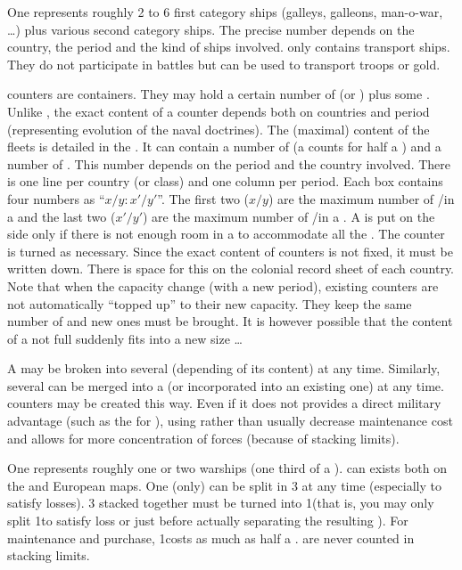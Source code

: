 \aparag[Detachments.] One \ND represents roughly 2 to 6 first category ships
(galleys, galleons, man-o-war, \ldots) plus various second category ships. The
precise number depends on the country, the period and the kind of ships
involved.
\bparag \NTD only contains transport ships. They do not participate in battles
but can be used to transport troops or gold.

\aparag[Fleets.] \FLEET counters are containers. They may hold a certain
number of \NWD (or \NGD) plus some \NTD.
\bparag Unlike \ARMY, the exact content of a \FLEET counter depends both on
countries and period (representing evolution of the naval doctrines).
\bparag The (maximal) content of the fleets is detailed in the
. It can contain a number of \NWD (a
\NGD counts for half a \NWD) and a number of \NTD. This number depends on the
period and the country involved.
\bparag There is one line per country (or class) and one column per
period. Each box contains four numbers as ``$x/y:x'/y'$''. The first two
($x/y$) are the maximum number of \NWD/\NTD in a \FLEET\facemoins and the last
two ($x'/y'$) are the maximum number of \NWD/\NTD in a \FLEET\faceplus.
\bparag A \FLEET is put on the side \Faceplus only if there is not enough room
in a \FLEET\facemoins to accommodate all the \ND. The counter is turned as
necessary.
\bparag Since the exact content of \FLEET counters is not fixed, it must be
written down. There is space for this on the colonial record sheet of each
country.
\bparag Note that when the capacity change (with a new period), existing
\FLEET counters are not automatically ``topped up'' to their new
capacity. They keep the same number of \ND and new ones must be brought. It is
however possible that the content of a not full \FLEET\Faceplus suddenly fits
into a new size \FLEET\Facemoins\ldots


 A \FLEET may be broken into several \ND
(depending of its content) at any time.
\bparag Similarly, several \ND can be merged into a \FLEET (or incorporated
into an existing one) at any time. \FLEET counters may be created this way.
\bparag Even if it does not provides a direct military advantage (such as the
 for \ARMY), using \FLEET rather than \ND usually
decrease maintenance cost and allows for more concentration of forces (because
of stacking limits).

 One \NDE represents roughly one or two
warships (one third of a \NWD).
\bparag \NDE can exists both on the \ROTW and European maps.
\bparag One \NWD (only) can be split in 3 \NDE at any time (especially to
satisfy losses). 3 \NDE stacked together must be turned into 1\NWD (that is,
you may only split 1\LD to satisfy loss or just before actually separating the
resulting \LDE).
\bparag For maintenance and purchase, 1\NDE costs as much as half a \NWD.
\bparag \NDE are never counted in stacking limits.

